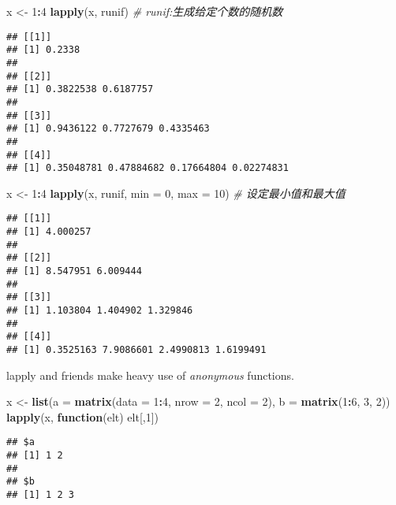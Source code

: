 \documentclass[
]{article}
\newenvironment{Shaded}{\begin{snugshade}}{\end{snugshade}}
\newcommand{\CommentTok}[1]{\textcolor[rgb]{0.56,0.35,0.01}{\textit{#1}}}
\newcommand{\ControlFlowTok}[1]{\textcolor[rgb]{0.13,0.29,0.53}{\textbf{#1}}}
\newcommand{\DataTypeTok}[1]{\textcolor[rgb]{0.13,0.29,0.53}{#1}}
\newcommand{\DecValTok}[1]{\textcolor[rgb]{0.00,0.00,0.81}{#1}}
\newcommand{\KeywordTok}[1]{\textcolor[rgb]{0.13,0.29,0.53}{\textbf{#1}}}
\newcommand{\NormalTok}[1]{#1}
\newcommand{\OperatorTok}[1]{\textcolor[rgb]{0.81,0.36,0.00}{\textbf{#1}}}
\newcommand{\StringTok}[1]{\textcolor[rgb]{0.31,0.60,0.02}{#1}}
\begin{document}
\begin{Shaded}
\begin{Highlighting}[]
\NormalTok{x \textless{}{-}}\StringTok{ }\DecValTok{1}\OperatorTok{:}\DecValTok{4}
\KeywordTok{lapply}\NormalTok{(x, runif) }\CommentTok{\# runif:生成给定个数的随机数}
\end{Highlighting}
\end{Shaded}

\begin{verbatim}
## [[1]]
## [1] 0.2338
## 
## [[2]]
## [1] 0.3822538 0.6187757
## 
## [[3]]
## [1] 0.9436122 0.7727679 0.4335463
## 
## [[4]]
## [1] 0.35048781 0.47884682 0.17664804 0.02274831
\end{verbatim}

\begin{Shaded}
\begin{Highlighting}[]
\NormalTok{x \textless{}{-}}\StringTok{ }\DecValTok{1}\OperatorTok{:}\DecValTok{4}
\KeywordTok{lapply}\NormalTok{(x, runif, }\DataTypeTok{min =} \DecValTok{0}\NormalTok{, }\DataTypeTok{max =} \DecValTok{10}\NormalTok{) }\CommentTok{\# 设定最小值和最大值}
\end{Highlighting}
\end{Shaded}

\begin{verbatim}
## [[1]]
## [1] 4.000257
## 
## [[2]]
## [1] 8.547951 6.009444
## 
## [[3]]
## [1] 1.103804 1.404902 1.329846
## 
## [[4]]
## [1] 0.3525163 7.9086601 2.4990813 1.6199491
\end{verbatim}

lapply and friends make heavy use of \emph{anonymous} functions.

\begin{Shaded}
\begin{Highlighting}[]
\NormalTok{x \textless{}{-}}\StringTok{ }\KeywordTok{list}\NormalTok{(}\DataTypeTok{a =} \KeywordTok{matrix}\NormalTok{(}\DataTypeTok{data =} \DecValTok{1}\OperatorTok{:}\DecValTok{4}\NormalTok{, }\DataTypeTok{nrow =} \DecValTok{2}\NormalTok{, }\DataTypeTok{ncol =} \DecValTok{2}\NormalTok{), }\DataTypeTok{b =} \KeywordTok{matrix}\NormalTok{(}\DecValTok{1}\OperatorTok{:}\DecValTok{6}\NormalTok{, }\DecValTok{3}\NormalTok{, }\DecValTok{2}\NormalTok{))}
\KeywordTok{lapply}\NormalTok{(x, }\ControlFlowTok{function}\NormalTok{(elt) elt[,}\DecValTok{1}\NormalTok{])}
\end{Highlighting}
\end{Shaded}

\begin{verbatim}
## $a
## [1] 1 2
## 
## $b
## [1] 1 2 3
\end{verbatim}
\end{document}
